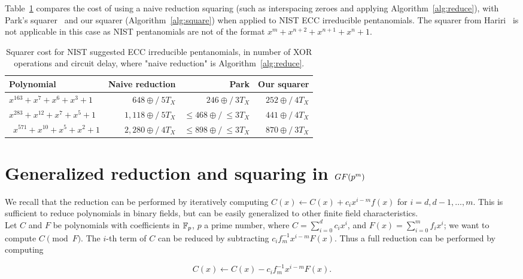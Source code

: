 Table~\ref{table:comparison_nist} compares the cost of using a naive reduction squaring (such as interspacing zeroes and applying Algorithm~\ref{alg:reduce}), with Park's squarer~\cite{park2012explicit} and our squarer (Algorithm~\ref{alg:square}) when applied to NIST ECC irreducible pentanomials. The squarer from Hariri~\cite{hariri2009bit} is not applicable in this case as NIST pentanomials are not of the format $x^m+x^{n+2}+x^{n+1}+x^{n}+1$. \\ 

\begin{table}
\centering
\smaller
\caption{Squarer cost for NIST suggested ECC irreducible pentanomials, in number of XOR operations and circuit delay, where "naive reduction" is Algorithm~\ref{alg:reduce}.}
{\begin{tabular}{l r r r} \label{table:comparison_nist}
Polynomial & Naive reduction & Park \cite{park2012explicit} & Our squarer \\ \hline
$x^{163} + x^7 + x^6 + x^3 + 1$ & $648\oplus/~5T_X$ & $246\oplus/~3T_X$ & $252\oplus/~4T_X$ \\ \hline
$x^{283} + x^{12} + x^7 + x^5 + 1$ & $1,118\oplus/~5T_X$ & $\leq468\oplus/~\leq3T_X$ & $441\oplus/~4T_X$ \\ \hline\
$x^{571} + x^{10} + x^5 + x^2 + 1$ & $2,280\oplus/~4T_X$ & $\leq898\oplus/~\leq3T_X$ & $870\oplus/~3T_X$
\end{tabular}}{}
\end{table}

\section{Generalized reduction and squaring in $GF(\MakeLowercase{p}^\MakeLowercase{m})$} \label{pth}

We recall that the reduction can be performed by iteratively computing $C(x) \leftarrow C(x) + c_{i} x^{i-m} f(x)$ for $i = d, d-1, \ldots, m$. This is sufficient to reduce polynomials in binary fields, but can be easily generalized to other finite field characteristics. \\

Let $C$ and $F$ be polynomials with coefficients in $\mathbb{F}_p$, $p$ a prime number, where $C = \sum_{i=0}^d c_i x^i$, and $F(x) = \sum_{i=0}^m f_i x^i$; we want to compute $C \pmod F$. The $i$-th term of $C$ can be reduced by subtracting $c_i f_m^{-1} x^{i-m} F(x)$. Thus a full reduction can be performed by computing

$$C(x) \leftarrow C(x) - c_i f_m^{-1} x^{i-m} F(x).$$

